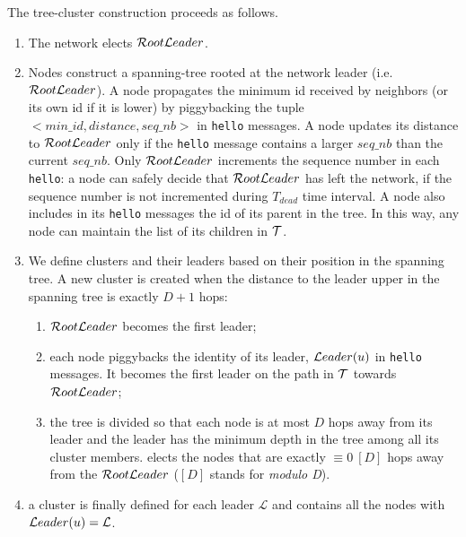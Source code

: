 \documentclass[twoside]{article}
\begin{document}
The tree-cluster construction proceeds as follows.
\begin{enumerate}
\item The network elects $\mathcal{R}oot\mathcal{L}eader$.








\item Nodes construct a spanning-tree rooted at the network leader
  (i.e. $\mathcal{R}oot\mathcal{L}eader$). A node propagates the minimum id received by
  neighbors (or its own id if it is lower) by piggybacking the tuple
  $<min\_id,distance,seq\_nb>$ in \texttt{hello} messages. A node
  updates its distance to $\mathcal{R}oot\mathcal{L}eader$ only if the \texttt{hello}
  message contains a larger $seq\_{nb}$ than the current
  $seq\_{nb}$. Only $\mathcal{R}oot\mathcal{L}eader$ increments the
  sequence number in each \texttt{hello}: a node can safely decide that $\mathcal{R}oot\mathcal{L}eader$ has
  left the network, if the sequence number is not incremented during
  $T_{dead}$ time interval.  A node also includes in its
  \texttt{hello} messages the id of its parent in the tree. In this
  way, any node can maintain the list of its children in $\mathcal{T}$.

\item We define clusters and their leaders based on their position in
  the spanning tree. A new cluster is created when the distance to the
  leader upper in the spanning tree is exactly $D+1$ hops:
	\begin{enumerate}
		\item $\mathcal{R}oot\mathcal{L}eader$ becomes the first leader; 
		\item each node piggybacks the identity of its leader,
                  $\mathcal{L}eader(u)$ in \texttt{hello} messages. It becomes
                  the first leader on the path in $\mathcal{T}$ towards
                  $\mathcal{R}oot\mathcal{L}eader$;
		\item the tree is divided so that each node is at most
                  $D$ hops away from its leader and the leader has the
                  minimum depth in the tree among all its cluster
                  members. \potatoes elects the nodes that are
                  exactly $\equiv 0\ [D]$ hops away from the
                  $\mathcal{R}oot\mathcal{L}eader$ ($[D]$ stands for \emph{modulo D}).
	\end{enumerate}
      \item a cluster is finally defined for each leader
        $\mathcal{L}$ and contains all the nodes with
        $\mathcal{L}eader(u)=\mathcal{L}$.
\end{enumerate}
\end{document}
